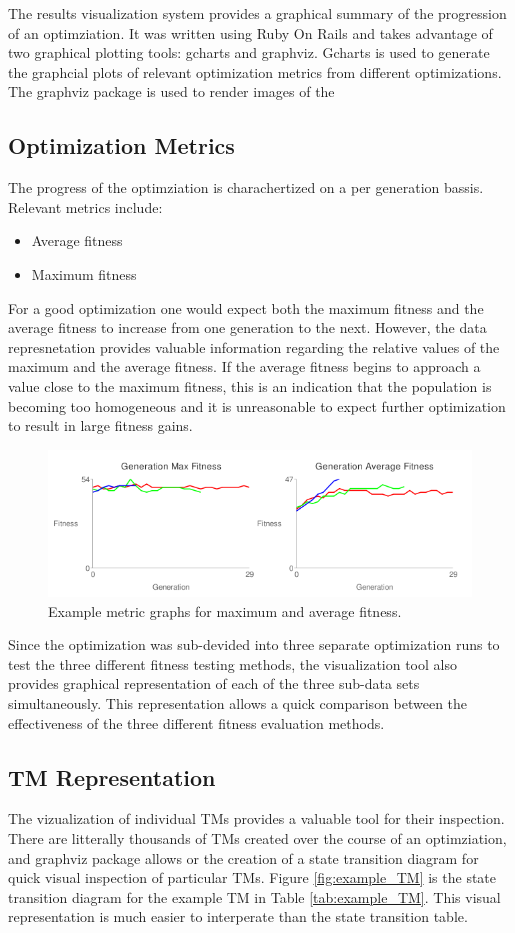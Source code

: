 The results visualization system provides a graphical summary of the progression of an optimziation. It was written using Ruby On Rails and takes advantage of two graphical plotting tools: gcharts and graphviz. Gcharts is used to generate the graphcial plots of relevant optimization metrics from different optimizations. The graphviz package is used to render images of the 

\subsection{Optimization Metrics}
The progress of the optimziation is charachertized on a per generation bassis. Relevant metrics include: 
\begin{itemize}
	\item Average fitness
	\item Maximum fitness
\end{itemize}

For a good optimization one would expect both the maximum fitness and the average fitness to increase from one generation to the next. However, the data represnetation provides valuable information regarding the relative values of the maximum and the average fitness. If the average fitness begins to approach a value close to the maximum fitness, this is an indication that the population is becoming too homogeneous and it is unreasonable to expect further optimization to result in large fitness gains.
\begin{figure}[!hbp]
  \centering
  \includegraphics[width = .75\textwidth]{images/sample_graphs}
  \caption{Example metric graphs for maximum and average fitness. \label{fig:sample_graphs}}
\end{figure}
Since the optimization was sub-devided into three separate optimization runs to test the three different fitness testing methods, the visualization tool also provides graphical representation of each of the three sub-data sets simultaneously. This representation allows a quick comparison between the effectiveness of the three different fitness evaluation methods.  

\subsection{TM Representation}
The vizualization of individual TMs provides a valuable tool for their inspection. There are litterally thousands of TMs created over the course of an optimziation, and graphviz package allows or the creation of a state transition diagram for quick visual inspection of particular TMs. Figure \ref{fig:example_TM} is the state transition diagram for the example TM in Table \ref{tab:example_TM}. This visual representation is much easier to interperate than the state transition table. 


